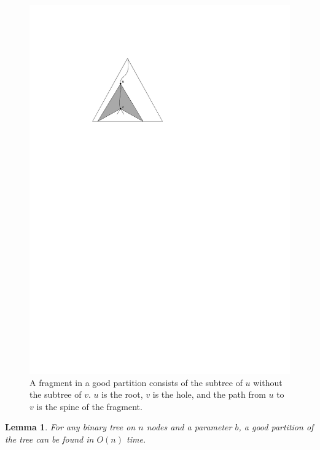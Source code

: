 \documentclass[11pt,a4paper]{article}
\newtheorem{lemma}{Lemma}
\theoremstyle{definition}
\theoremstyle{remark}
\begin{document}
\begin{figure}[ht]
\begin{center}
\includegraphics[scale=0.7]{fragment}
\end{center}
\caption{A fragment in a good partition consists of the subtree of $u$ without the subtree of $v$.
$u$ is the root, $v$ is the hole, and the path from $u$ to $v$ is the spine of the fragment. \label{fig:fragment}}
\end{figure}

\begin{lemma}
\label{basic partitioning lemma}
For any binary tree on $n$ nodes and a parameter $b$, a good partition of the tree can be found in $O(n)$ time.
\end{lemma}
\end{document}
